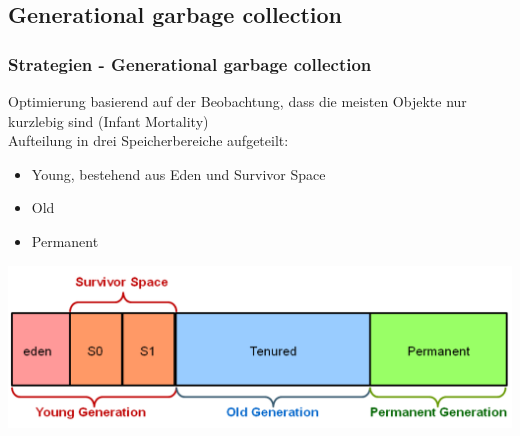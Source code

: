 \documentclass{beamer}
\begin{document}
        \subsection{Generational garbage collection}
            \begin{frame}
                \frametitle{Strategien - Generational garbage collection}
                Optimierung basierend auf der Beobachtung, dass die meisten Objekte nur kurzlebig sind (Infant Mortality)\\
                Aufteilung in drei Speicherbereiche aufgeteilt:
                \begin{itemize}
                    \item Young, bestehend aus Eden und Survivor Space
                    \item Old
                    \item Permanent
                \end{itemize}
                \includegraphics[width=\textwidth]{images/GenerationalGCHeapStructure.png}
            \end{frame}
\end{document}
